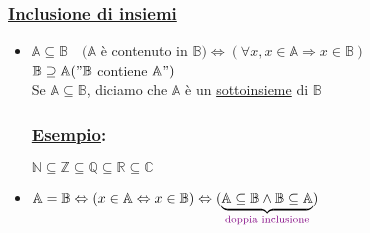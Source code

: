 \documentclass{article}
\newcommand{\ul}[1]{\underline{#1}}
\newcommand{\A}{\mathbb{A}}
\newcommand{\B}{\mathbb{B}}
\newcommand{\R}{\mathbb{R}}
\newcommand{\Esempio}[1]{\subsubsection*{\ul{Esempio}:}#1}
\newcommand{\colort}[2]{\text{\color{#1}#2}}
\begin{document}
\subsubsection*{\color{blue}\ul{Inclusione di insiemi}}
\begin{itemize}
	\item $\A\subseteq\B\quad(\A$ è contenuto in $\B)\Leftrightarrow(\forall x,x\in\A\Rightarrow x\in\B)$\\
	      {\color{violet}$\B\supseteq\A("\B$ contiene $\A")$}\\
	      Se $\A\subseteq\B$, diciamo che $\A$ è un \ul{sottoinsieme} di $\B$
	      \Esempio{$\mathbb{N}\subseteq\mathbb{Z}\subseteq\mathbb{Q}\subseteq\R\subseteq\mathbb{C}$}
	\item $\A=\B\Leftrightarrow(x\in\A\Leftrightarrow x\in\B)\Leftrightarrow(\underbrace{\A\subseteq\B\wedge\B\subseteq\A}_{\colort{violet}{doppia inclusione}})$
\end{itemize}
\end{document}
